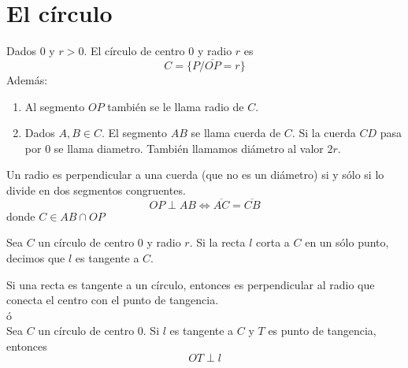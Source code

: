 \chapter{El círculo}

\begin{tcolorbox}[colframe=white]
\begin{def.}
    Dados $0$ y $r>0$. El círculo de centro $0$ y radio $r$ es $$C=\lbrace P/\overline{OP} = r \rbrace$$ Además:
    \begin{enumerate}[\bfseries 1)]
	
	\item Al segmento $OP$ también se le llama radio de $C$.

	\item Dados $A,B \in C$. El segmento $AB$ se llama cuerda de $C$. Si la cuerda $CD$ pasa por $0$ se llama diametro. También llamamos diámetro al valor $2r$.\\

    \end{enumerate}
\end{def.}
\end{tcolorbox}

    \begin{proposicion}
	Un radio es perpendicular a una cuerda (que no es un diámetro) si y sólo si lo divide en dos segmentos congruentes.
	$$OP \perp AB \Leftrightarrow \overline{AC} = \overline{CB}$$ donde $C \in AB \cap OP$\\
    \end{proposicion}


\begin{tcolorbox}[colframe=white]
\begin{def.}
    Sea $C$ un círculo de centro $0$ y radio $r$. Si la recta $l$ corta a $C$ en un sólo punto, decimos que $l$ es tangente a $C$.\\
\end{def.}
\end{tcolorbox}

    \begin{proposicion}
	Si una recta es tangente a un círculo, entonces es perpendicular al radio que conecta el centro con el punto de tangencia.\\	
	ó\\
	Sea $C$ un círculo de centro $0$. Si $l$ es tangente a $C$ y $T$ es punto de tangencia, entonces $$OT \perp l$$
    \end{proposicion}

